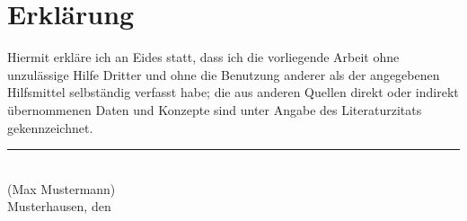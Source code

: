 
\cleardoublepage
\thispagestyle{plain}
\vspace*{\fill}

\section*{Erklärung}

Hiermit erkläre ich an Eides statt, dass ich die vorliegende
Arbeit ohne unzulässige Hilfe Dritter und ohne die Benutzung anderer
als der angegebenen Hilfsmittel selbständig verfasst habe;
die aus anderen Quellen direkt oder indirekt übernommenen Daten und Konzepte
sind unter Angabe des Literaturzitats gekennzeichnet.

\vskip2cm

\rule{5cm}{0.4pt}\\
(Max Mustermann)\\
Musterhausen, den \duedate